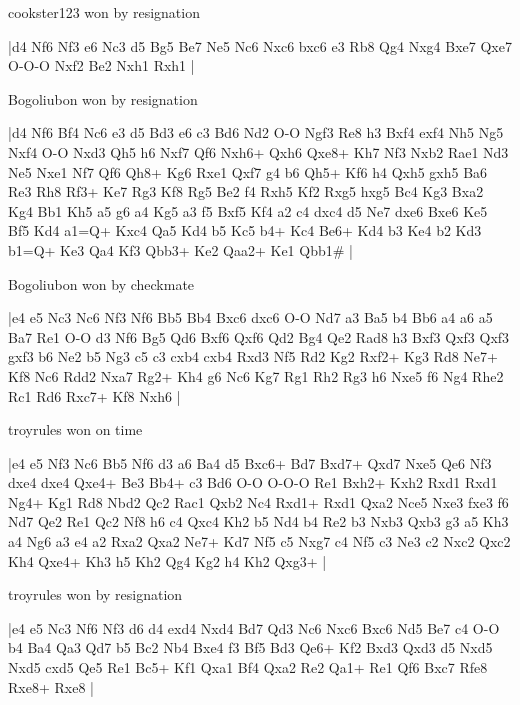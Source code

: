 \showboard

cookster123 won by resignation

\makegametitle
|d4 Nf6 Nf3 e6 Nc3 d5 Bg5 Be7 Ne5 Nc6 Nxc6 bxc6 e3 Rb8 Qg4 Nxg4 Bxe7 Qxe7 O-O-O Nxf2 Be2 Nxh1 Rxh1  |

\showboard

Bogoliubon won by resignation

\makegametitle
|d4 Nf6 Bf4 Nc6 e3 d5 Bd3 e6 c3 Bd6 Nd2 O-O Ngf3 Re8 h3 Bxf4 exf4 Nh5 Ng5 Nxf4 O-O Nxd3 Qh5 h6 Nxf7 Qf6 Nxh6+ Qxh6 Qxe8+ Kh7 Nf3 Nxb2 Rae1 Nd3 Ne5 Nxe1 Nf7 Qf6 Qh8+ Kg6 Rxe1 Qxf7 g4 b6 Qh5+ Kf6 h4 Qxh5 gxh5 Ba6 Re3 Rh8 Rf3+ Ke7 Rg3 Kf8 Rg5 Be2 f4 Rxh5 Kf2 Rxg5 hxg5 Bc4 Kg3 Bxa2 Kg4 Bb1 Kh5 a5 g6 a4 Kg5 a3 f5 Bxf5 Kf4 a2 c4 dxc4 d5 Ne7 dxe6 Bxe6 Ke5 Bf5 Kd4 a1=Q+ Kxc4 Qa5 Kd4 b5 Kc5 b4+ Kc4 Be6+ Kd4 b3 Ke4 b2 Kd3 b1=Q+ Ke3 Qa4 Kf3 Qbb3+ Ke2 Qaa2+ Ke1 Qbb1\#  |

\showboard

Bogoliubon won by checkmate

\makegametitle
|e4 e5 Nc3 Nc6 Nf3 Nf6 Bb5 Bb4 Bxc6 dxc6 O-O Nd7 a3 Ba5 b4 Bb6 a4 a6 a5 Ba7 Re1 O-O d3 Nf6 Bg5 Qd6 Bxf6 Qxf6 Qd2 Bg4 Qe2 Rad8 h3 Bxf3 Qxf3 Qxf3 gxf3 b6 Ne2 b5 Ng3 c5 c3 cxb4 cxb4 Rxd3 Nf5 Rd2 Kg2 Rxf2+ Kg3 Rd8 Ne7+ Kf8 Nc6 Rdd2 Nxa7 Rg2+ Kh4 g6 Nc6 Kg7 Rg1 Rh2 Rg3 h6 Nxe5 f6 Ng4 Rhe2 Rc1 Rd6 Rxc7+ Kf8 Nxh6  |

\showboard

troyrules won on time

\makegametitle
|e4 e5 Nf3 Nc6 Bb5 Nf6 d3 a6 Ba4 d5 Bxc6+ Bd7 Bxd7+ Qxd7 Nxe5 Qe6 Nf3 dxe4 dxe4 Qxe4+ Be3 Bb4+ c3 Bd6 O-O O-O-O Re1 Bxh2+ Kxh2 Rxd1 Rxd1 Ng4+ Kg1 Rd8 Nbd2 Qc2 Rac1 Qxb2 Nc4 Rxd1+ Rxd1 Qxa2 Nce5 Nxe3 fxe3 f6 Nd7 Qe2 Re1 Qc2 Nf8 h6 c4 Qxc4 Kh2 b5 Nd4 b4 Re2 b3 Nxb3 Qxb3 g3 a5 Kh3 a4 Ng6 a3 e4 a2 Rxa2 Qxa2 Ne7+ Kd7 Nf5 c5 Nxg7 c4 Nf5 c3 Ne3 c2 Nxc2 Qxc2 Kh4 Qxe4+ Kh3 h5 Kh2 Qg4 Kg2 h4 Kh2 Qxg3+  |

\showboard

troyrules won by resignation

\makegametitle
|e4 e5 Nc3 Nf6 Nf3 d6 d4 exd4 Nxd4 Bd7 Qd3 Nc6 Nxc6 Bxc6 Nd5 Be7 c4 O-O b4 Ba4 Qa3 Qd7 b5 Bc2 Nb4 Bxe4 f3 Bf5 Bd3 Qe6+ Kf2 Bxd3 Qxd3 d5 Nxd5 Nxd5 cxd5 Qe5 Re1 Bc5+ Kf1 Qxa1 Bf4 Qxa2 Re2 Qa1+ Re1 Qf6 Bxc7 Rfe8 Rxe8+ Rxe8  |

